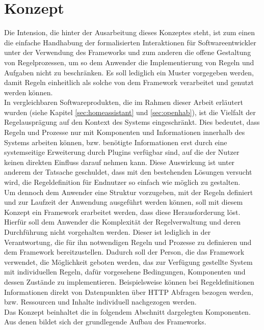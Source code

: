 \section{Konzept}
\label{sec:concept}
    Die Intension, die hinter der Ausarbeitung dieses Konzeptes steht, ist zum einen die einfache Handhabung der 
    formalisierten Interaktionen für Softwareentwickler %
    unter der Verwendung des Frameworks und zum anderen die 
    offene Gestaltung von Regelprozessen, um so dem Anwender die Implementierung von Regeln und Aufgaben nicht 
    zu beschränken. Es soll lediglich ein Muster vorgegeben werden, damit Regeln einheitlich als solche von dem Framework 
    verarbeitet und genutzt werden können. 
    \\ 
    \linebreak
    In vergleichbaren Softwareprodukten, die im Rahmen dieser Arbeit erläutert 
    wurden (siehe Kapitel \ref{sec:homeassistant} und \ref{sec:openhab}), ist die Vielfalt der Regelausprägung auf 
    den Kontext des Systems eingeschränkt. Dies bedeutet, dass 
    Regeln und Prozesse nur mit Komponenten und Informationen innerhalb des Systems arbeiten können, bzw. benötigte 
    Informationen erst durch eine systemseitige Erweiterung durch Plugins verfügbar sind, auf die der Nutzer keinen direkten 
    Einfluss darauf nehmen kann. Diese Auswirkung ist unter anderem der 
    Tatsache geschuldet, dass mit den bestehenden Lösungen versucht wird, die Regeldefinition für Endnutzer so 
    einfach wie möglich zu gestalten. 
    \\
    \linebreak
    Um dennoch dem Anwender eine Struktur vorzugeben, mit der Regeln definiert und zur Laufzeit der Anwendung ausgeführt 
    werden können, soll mit diesem Konzept ein Framework erarbeitet werden, dass diese Herausforderung löst. Hierfür soll 
    dem Anwender die Komplexität der Regelverwaltung und deren Durchführung nicht vorgehalten werden. Dieser ist lediglich 
    in der Verantwortung, die für ihn notwendigen Regeln und Prozesse zu definieren und dem Framework bereitzustellen. 
    Dadurch soll der Person, die das Framework verwendet, die Möglichkeit geboten werden, das zur Verfügung gestellte System 
    mit individuellen Regeln, dafür vorgesehene Bedingungen, Komponenten und dessen Zustände zu implementieren. Beispielsweise 
    können bei Regeldefinitionen Informationen direkt von Datenpunkten über \acs{HTTP} Abfragen bezogen werden, bzw. Ressourcen 
    und Inhalte individuell nachgezogen werden.
    \\ 
    Das Konzept beinhaltet die in folgendem Abschnitt dargelegten Komponenten. Aus denen bildet sich der grundlegende Aufbau 
    des Frameworks.

